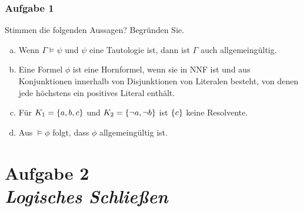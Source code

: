 \documentclass{beamer}
\begin{document}
	
	\begin{frame} \frametitle{Aufgabe 1}
		\footnotesize
		Stimmen die folgenden Aussagen? Begründen Sie.
		\begin{enumerate}[a)]
			\item Wenn $\Gamma \models \psi$ und $\psi$ eine Tautologie ist, dann ist $\Gamma$ auch allgemeingültig.
			
			\item Eine Formel $\phi$ ist eine Hornformel, wenn sie in NNF ist und aus Konjunktionen innerhalb von Disjunktionen von Literalen besteht, von denen jede höchstens ein positives Literal enthält.
			
			\item Für $K_1 = \left\{ a, b, c \right\}$ und $K_2 = \left\{ \lnot a, \lnot b \right\}$ ist $\left\{ c \right\}$ keine Resolvente.
			
			\item Aus $\models \phi$ folgt, dass $\phi$ allgemeingültig ist.
			
		\end{enumerate}
	\end{frame}

	\section{Aufgabe 2 \\ \itshape Logisches Schließen}
\end{document}
